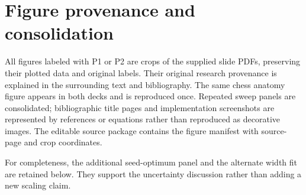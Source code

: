\section{Figure provenance and consolidation}
All figures labeled with P1 or P2 are crops of the supplied slide PDFs, preserving their plotted data and original labels. Their original research provenance is explained in the surrounding text and bibliography. The same chess anatomy figure appears in both decks and is reproduced once. Repeated sweep panels are consolidated; bibliographic title pages and implementation screenshots are represented by references or equations rather than reproduced as decorative images. The editable source package contains the figure manifest with source-page and crop coordinates.

For completeness, the additional seed-optimum panel and the alternate width fit are retained below. They support the uncertainty discussion rather than adding a new scaling claim.
\FloatBarrier
